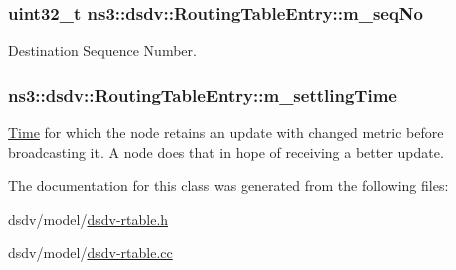 \subsubsection[{\texorpdfstring{m\+\_\+seq\+No}{m_seqNo}}]{\setlength{\rightskip}{0pt plus 5cm}uint32\+\_\+t ns3\+::dsdv\+::\+Routing\+Table\+Entry\+::m\+\_\+seq\+No\hspace{0.3cm}{\ttfamily [private]}}\hypertarget{classns3_1_1dsdv_1_1RoutingTableEntry_a17e9ec058eb434fa4caae105a44756af}{}\label{classns3_1_1dsdv_1_1RoutingTableEntry_a17e9ec058eb434fa4caae105a44756af}


Destination Sequence Number. 

\subsubsection[{\texorpdfstring{m\+\_\+settling\+Time}{m_settlingTime}}]{ ns3\+::dsdv\+::\+Routing\+Table\+Entry\+::m\+\_\+settling\+Time\hspace{0.3cm}{\ttfamily [private]}}\hypertarget{classns3_1_1dsdv_1_1RoutingTableEntry_aaca91e96d777062a28394ccb1a59814e}{}\label{classns3_1_1dsdv_1_1RoutingTableEntry_aaca91e96d777062a28394ccb1a59814e}
\hyperlink{classns3_1_1Time}{Time} for which the node retains an update with changed metric before broadcasting it. A node does that in hope of receiving a better update. 

The documentation for this class was generated from the following files\+:\begin{DoxyCompactItemize}
\item 
dsdv/model/\hyperlink{dsdv-rtable_8h}{dsdv-\/rtable.\+h}\item 
dsdv/model/\hyperlink{dsdv-rtable_8cc}{dsdv-\/rtable.\+cc}\end{DoxyCompactItemize}
